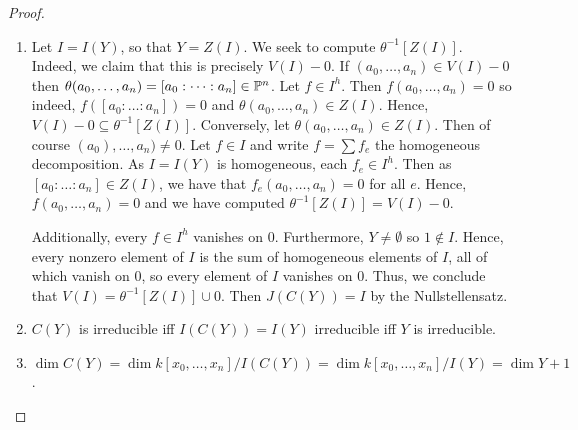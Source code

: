 \begin{proof}
    \begin{enumerate}[label= (\alph*)]
        \item Let $I = I(Y)$, so that $Y = Z(I)$. We seek to compute $\theta^{-1}[Z(I)]$. Indeed, we claim that this is precisely $V(I) - 0$. If $(a_0, \dots, a_n) \in V(I) - 0$ then $\theta(a_0, \dots, a_n) = [a_0 : \dots : a_n] \in \P^n$. Let $f \in I^h$. Then $f(a_0, \dots, a_n) = 0$ so indeed, $f([a_0 : \dots : a_n]) = 0$ and $\theta(a_0, \dots, a_n) \in Z(I)$. Hence, $V(I) - 0 \subseteq \theta^{-1}[Z(I)]$. Conversely, let $\theta(a_0, \dots, a_n) \in Z(I)$. Then of course $(a_0), \dots, a_n) \neq 0$. Let $f \in I$ and write $f = \sum f_e$ the homogeneous decomposition. As $I = I(Y)$ is homogeneous, each $f_e \in I^h$. Then as $[a_0 : \dots : a_n] \in Z(I)$, we have that $f_e(a_0, \dots, a_n) = 0$ for all $e$. Hence, $f(a_0, \dots, a_n) = 0$ and we have computed $\theta^{-1}[Z(I)] = V(I) - 0$.

        Additionally, every $f \in I^h$ vanishes on $0$. Furthermore, $Y \neq \emptyset$ so $1 \notin I$. Hence, every nonzero element of $I$ is the sum of homogeneous elements of $I$, all of which vanish on $0$, so every element of $I$ vanishes on $0$. Thus, we conclude that $V(I) = \theta^{-1}[Z(I)] \cup 0$. Then $J(C(Y)) = I$ by the Nullstellensatz.

        \item $C(Y)$ is irreducible iff $I(C(Y)) = I(Y)$ irreducible iff $Y$ is irreducible.

        \item $\dim C(Y) = \dim k[x_0, \dots, x_n] / I(C(Y)) = \dim k[x_0, \dots, x_n] / I(Y) = \dim Y + 1$.
    \end{enumerate}
\end{proof}
